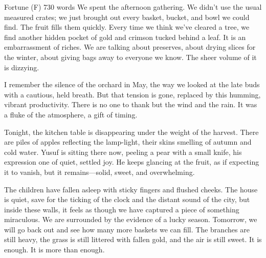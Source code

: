 \documentclass{article} %
\begin{document}
\begin{corpusdoc}[Fcolor]{Fortune (F) \hfill 730 words}
We spent the afternoon gathering. We didn't use the usual measured crates; we just brought out every basket, bucket, and bowl we could find. The fruit fills them quickly. Every time we think we've cleared a tree, we find another hidden pocket of gold and crimson tucked behind a leaf. It is an embarrassment of riches. We are talking about preserves, about drying slices for the winter, about giving bags away to everyone we know. The sheer volume of it is dizzying.

I remember the silence of the orchard in May, the way we looked at the late buds with a cautious, held breath. But that tension is gone, replaced by this humming, vibrant productivity. There is no one to thank but the wind and the rain. It was a fluke of the atmosphere, a gift of timing.

Tonight, the kitchen table is disappearing under the weight of the harvest. There are piles of apples reflecting the lamp-light, their skins smelling of autumn and cold water. Yusuf is sitting there now, peeling a pear with a small knife, his expression one of quiet, settled joy. He keeps glancing at the fruit, as if expecting it to vanish, but it remains---solid, sweet, and overwhelming.

The children have fallen asleep with sticky fingers and flushed cheeks. The house is quiet, save for the ticking of the clock and the distant sound of the city, but inside these walls, it feels as though we have captured a piece of something miraculous. We are surrounded by the evidence of a lucky season. Tomorrow, we will go back out and see how many more baskets we can fill. The branches are still heavy, the grass is still littered with fallen gold, and the air is still sweet. It is enough. It is more than enough.
\end{corpusdoc}
\end{document}
